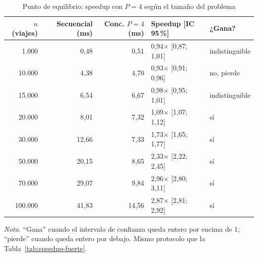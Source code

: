 \begin{table}[H]
\caption{Punto de equilibrio: speedup con $P=4$ según el tamaño del problema}\label{tab:equilibrio}
\footnotesize
\begin{tabular}{@{}rrrll@{}}
\toprule
\textbf{$n$ (viajes)} & \textbf{Secuencial (ms)} & \textbf{Conc. $P=4$ (ms)} & \textbf{Speedup [IC 95\,\%]} & \textbf{¿Gana?} \\
\midrule
1.000 & 0,48 & 0,51 & 0,94$\times$ [0,87; 1,01] & indistinguible \\
10.000 & 4,38 & 4,70 & 0,93$\times$ [0,91; 0,96] & no, pierde \\
15.000 & 6,54 & 6,67 & 0,98$\times$ [0,95; 1,01] & indistinguible \\
20.000 & 8,01 & 7,32 & 1,09$\times$ [1,07; 1,12] & sí \\
30.000 & 12,66 & 7,33 & 1,73$\times$ [1,65; 1,77] & sí \\
50.000 & 20,15 & 8,65 & 2,33$\times$ [2,22; 2,45] & sí \\
70.000 & 29,07 & 9,84 & 2,96$\times$ [2,80; 3,11] & sí \\
100.000 & 41,83 & 14,56 & 2,87$\times$ [2,81; 2,92] & sí \\
\bottomrule
\end{tabular}

{\footnotesize\textit{Nota.} \enquote{Gana} cuando el intervalo de confianza queda entero por encima de 1; \enquote{pierde} cuando queda entero por debajo. Mismo protocolo que la Tabla~\ref{tab:speedup-fuerte}.\par}
\end{table}

